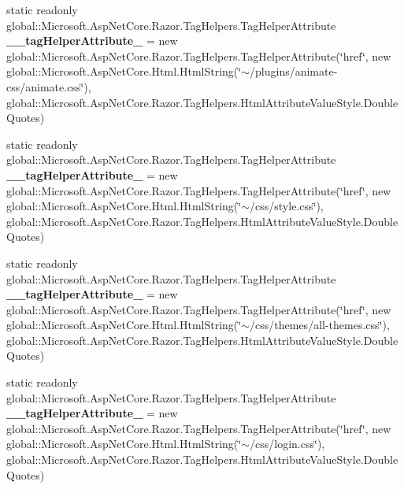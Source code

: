 \begin{DoxyCompactItemize}
\item 
\mbox{\label{class_asp_net_core_1_1_views___shared_____layout_a63e47318f65dbf5cdde8d7608080664d}} 
static readonly global\+::\+Microsoft.\+Asp\+Net\+Core.\+Razor.\+Tag\+Helpers.\+Tag\+Helper\+Attribute {\bfseries \+\_\+\+\_\+tag\+Helper\+Attribute\+\_} = new global\+::\+Microsoft.\+Asp\+Net\+Core.\+Razor.\+Tag\+Helpers.\+Tag\+Helper\+Attribute(\char`\"{}href\char`\"{}, new global\+::\+Microsoft.\+Asp\+Net\+Core.\+Html.\+Html\+String(\char`\"{}$\sim$/plugins/animate-\/css/animate.\+css\char`\"{}), global\+::\+Microsoft.\+Asp\+Net\+Core.\+Razor.\+Tag\+Helpers.\+Html\+Attribute\+Value\+Style.\+Double\+Quotes)
\item 
\mbox{\label{class_asp_net_core_1_1_views___shared_____layout_aeafec702ee7db3cac3cc7c3fa2daff76}} 
static readonly global\+::\+Microsoft.\+Asp\+Net\+Core.\+Razor.\+Tag\+Helpers.\+Tag\+Helper\+Attribute {\bfseries \+\_\+\+\_\+tag\+Helper\+Attribute\+\_} = new global\+::\+Microsoft.\+Asp\+Net\+Core.\+Razor.\+Tag\+Helpers.\+Tag\+Helper\+Attribute(\char`\"{}href\char`\"{}, new global\+::\+Microsoft.\+Asp\+Net\+Core.\+Html.\+Html\+String(\char`\"{}$\sim$/css/style.\+css\char`\"{}), global\+::\+Microsoft.\+Asp\+Net\+Core.\+Razor.\+Tag\+Helpers.\+Html\+Attribute\+Value\+Style.\+Double\+Quotes)
\item 
\mbox{\label{class_asp_net_core_1_1_views___shared_____layout_a545bce83d9f352ad03e1c0b40e23b55a}} 
static readonly global\+::\+Microsoft.\+Asp\+Net\+Core.\+Razor.\+Tag\+Helpers.\+Tag\+Helper\+Attribute {\bfseries \+\_\+\+\_\+tag\+Helper\+Attribute\+\_} = new global\+::\+Microsoft.\+Asp\+Net\+Core.\+Razor.\+Tag\+Helpers.\+Tag\+Helper\+Attribute(\char`\"{}href\char`\"{}, new global\+::\+Microsoft.\+Asp\+Net\+Core.\+Html.\+Html\+String(\char`\"{}$\sim$/css/themes/all-\/themes.\+css\char`\"{}), global\+::\+Microsoft.\+Asp\+Net\+Core.\+Razor.\+Tag\+Helpers.\+Html\+Attribute\+Value\+Style.\+Double\+Quotes)
\item 
\mbox{\label{class_asp_net_core_1_1_views___shared_____layout_a6dc0ba638421d3beb7f756f0eeba5c23}} 
static readonly global\+::\+Microsoft.\+Asp\+Net\+Core.\+Razor.\+Tag\+Helpers.\+Tag\+Helper\+Attribute {\bfseries \+\_\+\+\_\+tag\+Helper\+Attribute\+\_} = new global\+::\+Microsoft.\+Asp\+Net\+Core.\+Razor.\+Tag\+Helpers.\+Tag\+Helper\+Attribute(\char`\"{}href\char`\"{}, new global\+::\+Microsoft.\+Asp\+Net\+Core.\+Html.\+Html\+String(\char`\"{}$\sim$/css/login.\+css\char`\"{}), global\+::\+Microsoft.\+Asp\+Net\+Core.\+Razor.\+Tag\+Helpers.\+Html\+Attribute\+Value\+Style.\+Double\+Quotes)

\end{DoxyCompactItemize}
